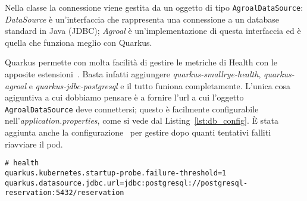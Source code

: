 \myskip

Nella classe la connessione viene gestita da un oggetto di tipo \texttt{AgroalDataSource}\cite{quarkus_datasource}: \textit{DataSource} è un'interfaccia che rappresenta una connessione a un database standard in Java (JDBC); \textit{Agroal} è un'implementazione di questa interfaccia ed è quella che funziona meglio con Quarkus.

Quarkus permette con molta facilità di gestire le metriche di Health con le apposite estensioni~\cite{quarkus_health}. Basta infatti aggiungere \textit{quarkus-smallrye-health}, \textit{quarkus-agroal} e \textit{quarkus-jdbc-postgresql} e il tutto funiona completamente. L'unica cosa agiguntiva a cui dobbiamo pensare è a fornire l'url a cui l'oggetto \texttt{AgroalDataSource} deve connettersi; questo è facilmente configurabile nell'\textit{application.properties}, come si vede dal Listing~\ref{lst:db_config}. È stata aggiunta anche la configurazione~\cite{quarkus_all_config} per gestire dopo quanti tentativi falliti riavviare il pod.
\begin{lstlisting}[caption=JDBC configuration., label=lst:db_config]
# health
quarkus.kubernetes.startup-probe.failure-threshold=1
quarkus.datasource.jdbc.url=jdbc:postgresql://postgresql-reservation:5432/reservation
\end{lstlisting}